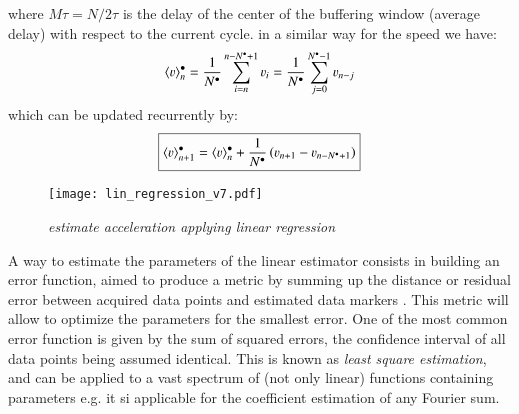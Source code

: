 where $M\tau= N/2 \tau$ is the delay of the center of the buffering window (average delay) with respect to the current cycle.
in a similar way for the speed we have:
\begin{equation}
\langle \varv \rangle^\bullet_n=\frac{1}{N^\bullet}\sum\limits_{i=n}^{n-N^\bullet+1} \varv_i =\frac{1}{N^\bullet}\sum\limits_{j=0}^{N^\bullet-1} \varv_{n-j}
\end{equation}
which can be updated recurrently by:
\begin{equation}
\boxed{
\langle \varv \rangle^\bullet_{n+1}=\langle \varv \rangle^\bullet_n +\frac{1}{N^\bullet}\left( \varv_{n+1} - \varv_{n-N^\bullet+1}\right)
}
\end{equation}
\begin{figure}[h!]
\centerline{
\texttt{[image: lin\_regression\_v7.pdf]}
}
\caption{\emph{estimate acceleration applying linear regression}}
\label {fig:lregression}
\end{figure}


A way to estimate the parameters of the linear estimator consists in building an error function, aimed to produce a metric by summing up the distance or residual error between acquired data points and estimated data markers \cite{bevington}. This metric will allow to optimize the parameters for the smallest error. One of the most common error function is given by the sum of squared errors, the confidence interval of all data points being assumed identical. This is known as \emph{least square estimation}, and can be applied to a vast spectrum of (not only linear) functions containing parameters e.g. it si applicable for the coefficient estimation of any Fourier sum.

